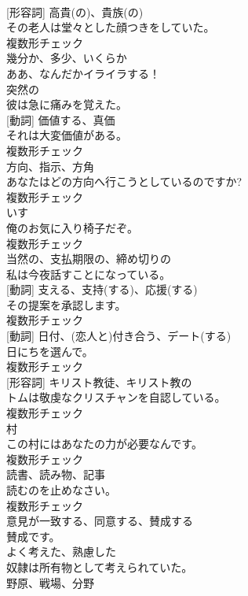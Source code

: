 \documentclass[8pt]{extreport}
\begin{document}
\begin{CJK}{UTF8}{min}
\\	[名詞] [形容詞]	高貴(の)、貴族(の)	
\\	その老人は堂々とした顔つきをしていた。	
\\	複数形チェック
\\	[副詞]	幾分か、多少、いくらか	
\\	ああ、なんだかイライラする！	
\\	[形容詞]	突然の	
\\	彼は急に痛みを覚えた。	
\\	[名詞] [動詞]	価値する、真価	
\\	それは大変価値がある。	
\\	複数形チェック
\\	[名詞]	方向、指示、方角	
\\	あなたはどの方向へ行こうとしているのですか?	
\\	複数形チェック
\\	[名詞]	いす	
\\	俺のお気に入り椅子だぞ。	
\\	複数形チェック
\\	[形容詞]	当然の、支払期限の、締め切りの	
\\	私は今夜話すことになっている。	
\\	[名詞] [動詞]	支える、支持(する)、応援(する)	
\\	その提案を承認します。	
\\	複数形チェック
\\	[名詞] [動詞]	日付、(恋人と)付き合う、デート(する)	
\\	日にちを選んで。	
\\	複数形チェック
\\	[名詞] [形容詞]	キリスト教徒、キリスト教の	
\\	トムは敬虔なクリスチャンを自認している。	
\\	複数形チェック
\\	[名詞]	村	
\\	この村にはあなたの力が必要なんです。	
\\	複数形チェック
\\	[名詞]	読書、読み物、記事	
\\	読むのを止めなさい。	
\\	複数形チェック
\\	[動詞]	意見が一致する、同意する、賛成する	
\\	賛成です。	
\\	[形容詞]	よく考えた、熟慮した	
\\	奴隷は所有物として考えられていた。	
\\	[名詞]	野原、戦場、分野	

\end{CJK}
\end{document}
